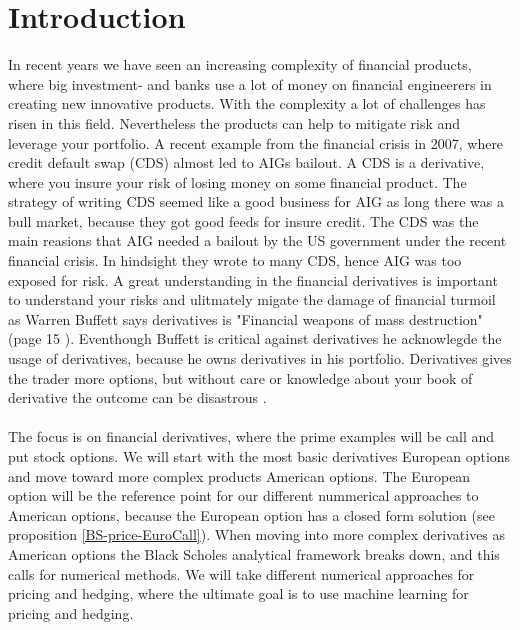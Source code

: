 
\chapter{Introduction} %

\label{Chapter1} %

In recent years we have seen an increasing complexity of financial products, where big investment- and banks use a lot of money on financial engineerers in creating new innovative products. With the complexity a lot of challenges has risen in this field. Nevertheless the products can help to mitigate risk and leverage your portfolio. A recent example from the financial crisis in 2007, where credit default swap (CDS) almost led to AIGs bailout. A CDS is a derivative, where you insure your risk of losing money on some financial product. The strategy of writing CDS seemed like a good business for AIG as long there was a bull market, because they got good feeds for insure credit. The CDS was the main reasions that AIG needed a bailout by the US government under the recent financial crisis. In hindsight they wrote to many CDS, hence AIG was too exposed for risk. A great understanding in the financial derivatives is important to understand your risks and ulitmately migate the damage of financial turmoil as Warren Buffett says derivatives is "Financial weapons of mass destruction" (page 15 \parencite{Buffett02}). Eventhough Buffett is critical against derivatives he acknowlegde the usage of derivatives, because he owns derivatives in his portfolio. Derivatives gives the trader more options, but without care or knowledge about your book of derivative the outcome can be disastrous  \parencite{Buffett08}.
\\
\\
The focus is on financial derivatives, where the prime examples will be call and put stock options. We will start with the most basic derivatives European options and move toward more complex products American options. The European option will be the reference point for our different nummerical approaches to American options, because the European option has a closed form solution (see proposition \ref{BS-price-EuroCall}). When moving into more complex derivatives as American options the Black Scholes analytical framework breaks down, and this calls for numerical methods. We will take different numerical approaches for pricing and hedging, where the ultimate goal is to use machine learning for pricing and hedging.
